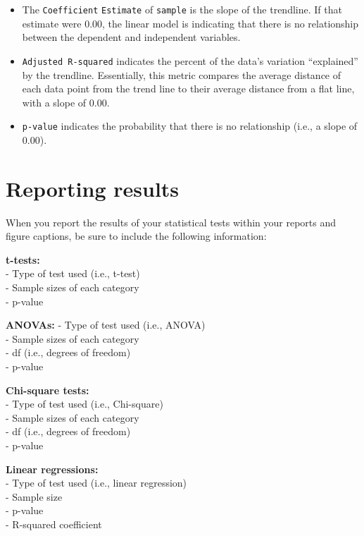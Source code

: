 \documentclass[
]{book}
\begin{document}
\begin{itemize}
\item
  The \texttt{Coefficient} \texttt{Estimate} of \texttt{sample} is the slope of the trendline. If that estimate were 0.00, the linear model is indicating that there is no relationship between the dependent and independent variables.
\item
  \texttt{Adjusted\ R-squared} indicates the percent of the data's variation ``explained'' by the trendline. Essentially, this metric compares the average distance of each data point from the trend line to their average distance from a flat line, with a slope of 0.00.
\item
  \texttt{p-value} indicates the probability that there is no relationship (i.e., a slope of 0.00).
\end{itemize}

\hypertarget{reporting-results}{%
\section*{Reporting results}\label{reporting-results}}

When you report the results of your statistical tests within your reports and figure captions, be sure to include the following information:

\textbf{t-tests:}\\
- Type of test used (i.e., t-test)\\
- Sample sizes of each category\\
- p-value

\textbf{ANOVAs:}
- Type of test used (i.e., ANOVA)\\
- Sample sizes of each category\\
- df (i.e., degrees of freedom)\\
- p-value

\textbf{Chi-square tests:}\\
- Type of test used (i.e., Chi-square)\\
- Sample sizes of each category\\
- df (i.e., degrees of freedom)\\
- p-value

\textbf{Linear regressions:}\\
- Type of test used (i.e., linear regression)\\
- Sample size\\
- p-value\\
- R-squared coefficient
\end{document}
